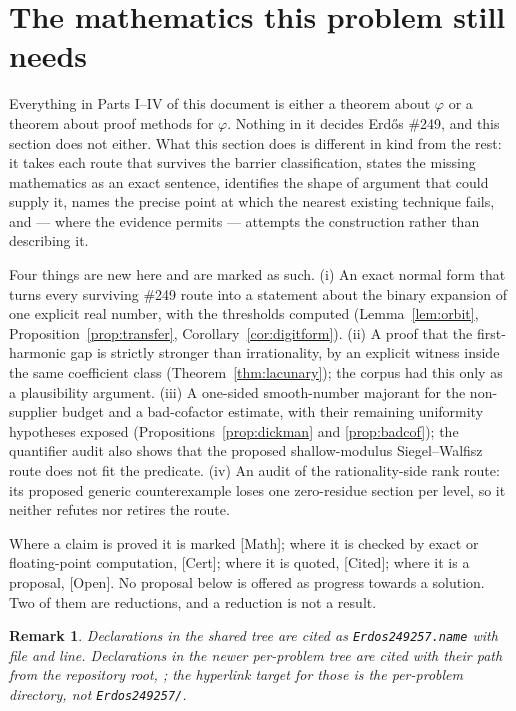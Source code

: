 \documentclass[11pt]{article}
\DeclareRobustCommand{\breakcode}[1]{\seqsplit{#1}}
\theoremstyle{breakplain}
\theoremstyle{breakdefinition}
\theoremstyle{breakdefinition}
\newtheorem{rem}[thm]{Remark}
\newcommand{\ev}[1]{{\small\textsf{[#1]}}\xspace}
\begin{document}
\section{The mathematics this problem still needs}

Everything in Parts I--IV of this document is either a theorem about
$\varphi$ or a theorem about proof methods for $\varphi$. Nothing in it
decides Erd\H{o}s \#249, and this section does not either. What this section
does is different in kind from the rest: it takes each route that survives
the barrier classification, states the missing mathematics as an exact
sentence, identifies the shape of argument that could supply it, names the
precise point at which the nearest existing technique fails, and --- where
the evidence permits --- attempts the construction rather than describing it.

Four things are new here and are marked as such. (i) An exact normal form
that turns every surviving \#249 route into a statement about the binary
expansion of one explicit real number, with the thresholds computed
(Lemma~\ref{lem:orbit}, Proposition~\ref{prop:transfer},
Corollary~\ref{cor:digitform}). (ii) A proof that the first-harmonic gap is
strictly stronger than irrationality, by an explicit witness inside the same
coefficient class (Theorem~\ref{thm:lacunary}); the corpus had this only as
a plausibility argument. (iii) A one-sided smooth-number majorant for the
non-supplier budget and a bad-cofactor estimate, with their remaining
uniformity hypotheses exposed (Propositions~\ref{prop:dickman} and
\ref{prop:badcof}); the quantifier audit also shows that the proposed
shallow-modulus Siegel--Walfisz route does not fit the predicate. (iv) An
audit of the rationality-side rank route: its proposed generic counterexample
loses one zero-residue section per level, so it neither refutes nor retires
the route.

Where a claim is proved it is marked \ev{Math}; where it is checked by exact
or floating-point computation, \ev{Cert}; where it is quoted, \ev{Cited};
where it is a proposal, \ev{Open}. No proposal below is offered as progress
towards a solution. Two of them are reductions, and a reduction is not a
result.

\begin{rem}
Declarations in the shared tree are cited as
\texttt{Erdos249257.name} with file and line. Declarations in the newer
per-problem tree are cited with their path from the repository root,
\texttt{\breakcode{ErdosProblems/Erdos249/File.lean:line}}; the hyperlink target for
those is the per-problem directory, not \texttt{Erdos249257/}.
\end{rem}
\end{document}
